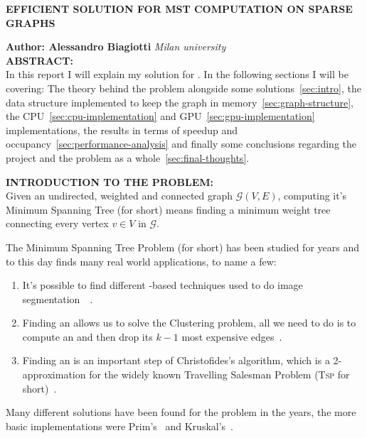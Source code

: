 \documentclass[a4paper,10pt]{article}
\begin{document}
\noindent
\begin{center}
	\textbf{{EFFICIENT SOLUTION FOR MST COMPUTATION ON SPARSE GRAPHS}} \\
\end{center}

\noindent
\textbf{Author: Alessandro Biagiotti} \hfill \textit{Milan university}
\\

\noindent
\textbf{ABSTRACT:}
\\
In this report I will explain my solution for \mstp. In the following sections I will be covering:
The theory behind the problem alongside some solutions~\ref{sec:intro}, the data structure implemented to keep the graph in memory~\ref{sec:graph-structure}, the CPU~\ref{sec:cpu-implementation} and GPU~\ref{sec:gpu-implementation} implementations, the results in terms of speedup and occupancy~\ref{sec:performance-analysis} and finally some conclusions regarding the project and the problem as a whole~\ref{sec:final-thoughts}.

\bigskip

\makeatletter{}\makeatother\label{sec:intro}
\noindent
\textbf{INTRODUCTION TO THE PROBLEM:}
\\
Given an undirected, weighted and connected graph $\mathcal{G}(V, E)$, computing it's Minimum
Spanning Tree (\mst for short) means finding a minimum weight tree connecting every vertex $v \in V$ in
$\mathcal{G}$.

The Minimum Spanning Tree Problem (\mstp for short) has been studied for years and to this day finds many real world applications, to name a few:
\begin{enumerate}
	\item It's possible to find different \mst-based techniques used to do image segmentation~\cite{maze-generation}~\cite{mst-segmentation-heuristic}.
	\item Finding an \mst allows us to solve the Clustering problem, all we need to do is to compute an \mst and then drop its $k - 1$ most expensive edges~\cite{mst-applications}.
	\item Finding an \mst is an important step of Christofides's algorithm, which is a 2-approximation for the widely known Travelling Salesman Problem (\textsc{Tsp} for short)~\cite{tsp-christofides}.
\end{enumerate}

Many different solutions have been found for the problem in the years, the more basic implementations were Prim's~\cite{prim-algorithm} and Kruskal's~\cite{kruskal-algorithm}.
\end{document}
